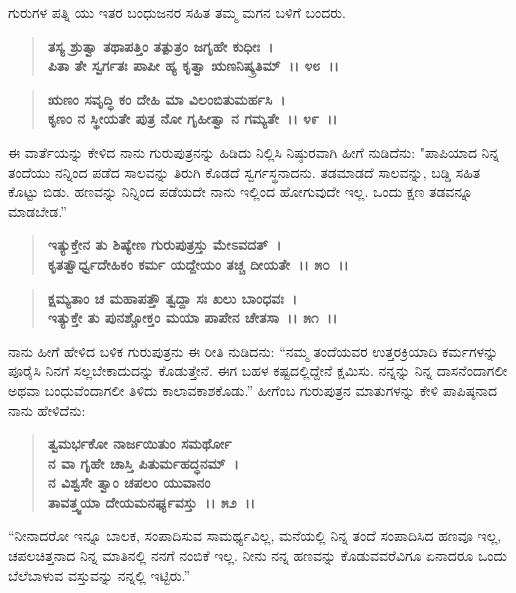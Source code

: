 ಗುರುಗಳ ಪತ್ನಿ ಯು ಇತರ ಬಂಧುಜನರ ಸಹಿತ ತಮ್ಮ ಮಗನ ಬಳಿಗೆ ಬಂದರು.

\begin{verse}
\textbf{ತಸ್ಯ ಶ್ರುತ್ವಾ ತಥಾಪತ್ತಿಂ ತತ್ಪುತ್ರಂ ಜಗೃಹೇ ಕುಧೀಃ~।}\\\textbf{ಪಿತಾ ತೇ ಸ್ವರ್ಗತಃ ಪಾಪೀ ಹ್ಯ ಕೃತ್ವಾ ಋಣನಿಷ್ಕ್ರತಿಮ್~।। ೪೮~।। }
\end{verse}

\begin{verse}
\textbf{ಋಣಂ ಸವೃದ್ಧಿ ಕಂ ದೇಹಿ ಮಾ ವಿಲಂಬಿತುಮರ್ಹಸಿ~।}\\\textbf{ಕೃಣಂ ನ ಸ್ಥೀಯತೇ ಪುತ್ರ ನೋ ಗೃಹೀತ್ವಾ ನ ಗಮ್ಯತೇ~।। ೪೯~।।}
\end{verse}

ಈ ವಾರ್ತೆಯನ್ನು ಕೇಳಿದ ನಾನು ಗುರುಪುತ್ರನನ್ನು ಹಿಡಿದು ನಿಲ್ಲಿಸಿ ನಿಷ್ಠುರವಾಗಿ ಹೀಗೆ ನುಡಿದೆನು: "ಪಾಪಿಯಾದ ನಿನ್ನ ತಂದೆಯು ನನ್ನಿಂದ ಪಡೆದ ಸಾಲವನ್ನು ತಿರುಗಿ ಕೊಡದೆ ಸ್ವರ್ಗಸ್ಥನಾದನು. ತಡಮಾಡದೆ ಸಾಲವನ್ನು, ಬಡ್ಡಿ ಸಹಿತ ಕೊಟ್ಟು ಬಿಡು. ಹಣವನ್ನು ನಿನ್ನಿಂದ ಪಡೆಯದೇ ನಾನು ಇಲ್ಲಿಂದ ಹೋಗುವುದೇ ಇಲ್ಲ. ಒಂದು ಕ್ಷಣ ತಡವನ್ನೂ ಮಾಡಬೇಡ.”

\begin{verse}
\textbf{ಇತ್ಯುಕ್ತೇನ ತು ಶಿಷ್ಯೇಣ ಗುರುಪುತ್ರಸ್ತು ಮೇಽವದತ್~।}\\\textbf{ ಕೃತತ್ವೌರ್ಧ್ವದೇಹಿಕಂ ಕರ್ಮ ಯದ್ದೇಯಂ ತಚ್ಚ ದೀಯತೇ~।। ೫೦~।। }
\end{verse}

\begin{verse}
\textbf{ಕ್ಷಮ್ಯತಾಂ ಚ ಮಹಾಪತ್ತೌ ತ್ವದ್ದಾ ಸಃ ಖಲು ಬಾಂಧವಃ~।}\\\textbf{ಇತ್ಯುಕ್ತೇ ತು ಪುನಶ್ಚೋಕ್ತಂ ಮಯಾ ಪಾಪೇನ ಚೇತಸಾ~।। ೫೧~।।}
\end{verse}

ನಾನು ಹೀಗೆ ಹೇಳಿದ ಬಳಿಕ ಗುರುಪುತ್ರನು ಈ ರೀತಿ ನುಡಿದನು: “ನಮ್ಮ ತಂದೆಯವರ ಉತ್ತರಕ್ರಿಯಾದಿ ಕರ್ಮಗಳನ್ನು ಪೂರೈಸಿ ನಿನಗೆ ಸಲ್ಲಬೇಕಾದುದನ್ನು ಕೊಡುತ್ತೇನೆ. ಈಗ ಬಹಳ ಕಷ್ಟದಲ್ಲಿದ್ದೇನೆ ಕ್ಷಮಿಸು. ನನ್ನನ್ನು ನಿನ್ನ ದಾಸನೆಂದಾಗಲೀ ಅಥವಾ ಬಂಧುವೆಂದಾಗಲೀ ತಿಳಿದು ಕಾಲಾವಕಾಶಕೊಡು.” ಹೀಗೆಂಬ ಗುರುಪುತ್ರನ ಮಾತುಗಳನ್ನು ಕೇಳಿ ಪಾಪಿಷ್ಠನಾದ ನಾನು ಹೇಳಿದೆನು:

\begin{verse}
\textbf{ತ್ವಮರ್ಭಕೋ ನಾರ್ಜಯಿತುಂ ಸಮರ್ಥೋ}\\\textbf{ನ ವಾ ಗೃಹೇ ಚಾಸ್ತಿ ಪಿತುರ್ಮಹದ್ಧನಮ್~।}\\\textbf{ನ ವಿಶ್ವಸೇ ತ್ವಾಂ ಚಪಲಂ ಯುವಾನಂ} \\\textbf{ತಾವತ್ತ್ವಯಾ ದೇಯಮನರ್ಘ್ಯವಸ್ತು~।। ೫೨~।।}
\end{verse}

“ನೀನಾದರೋ ಇನ್ನೂ ಬಾಲಕ, ಸಂಪಾದಿಸುವ ಸಾಮರ್ಥ್ಯವಿಲ್ಲ, ಮನೆಯಲ್ಲಿ ನಿನ್ನ ತಂದೆ ಸಂಪಾದಿಸಿದ ಹಣವೂ ಇಲ್ಲ, ಚಪಲಚಿತ್ತನಾದ ನಿನ್ನ ಮಾತಿನಲ್ಲಿ ನನಗೆ ನಂಬಿಕೆ ಇಲ್ಲ. ನೀನು ನನ್ನ ಹಣವನ್ನು ಕೊಡುವವರೆವಿಗೂ ಏನಾದರೂ ಒಂದು ಬೆಲೆಬಾಳುವ ವಸ್ತುವನ್ನು ನನ್ನಲ್ಲಿ ಇಟ್ಟಿರು.”

